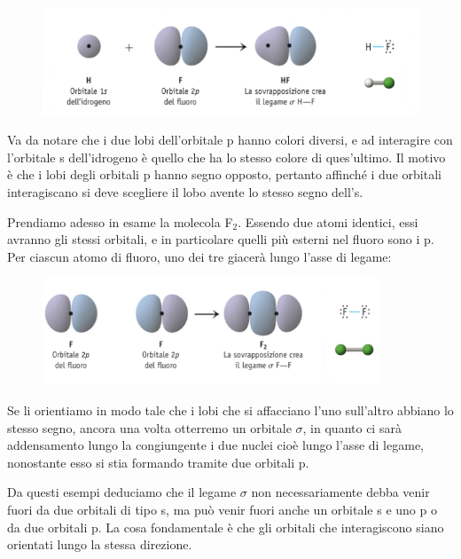 \vspace{-0.5cm}\begin{figure}[htp]
    \centering
    \includegraphics[width=12cm]{immagini/legame_H-F.png}
\end{figure}

\vspace{-0.5cm}Va da notare che i due lobi dell'orbitale p hanno colori diversi, e ad interagire con l'orbitale s dell'idrogeno è quello che ha lo stesso colore di ques'ultimo. Il motivo è che i lobi degli orbitali p hanno segno opposto, pertanto affinché i due orbitali interagiscano si deve scegliere il lobo avente lo stesso segno dell's.

\vspace{0.2cm} Prendiamo adesso in esame la molecola F$_2$. Essendo due atomi identici, essi avranno gli stessi orbitali, e in particolare quelli più esterni nel fluoro sono i p. Per ciascun atomo di fluoro, uno dei tre giacerà lungo l'asse di legame:

\vspace{-0.5cm}\begin{figure}[htp]
    \centering
    \includegraphics[width=10cm]{immagini/legame-F_2.png}
\end{figure}

\vspace{-0.5cm}Se li orientiamo in modo tale che i lobi che si affacciano l'uno sull'altro abbiano lo stesso segno, ancora una volta otterremo un orbitale $\sigma$, in quanto ci sarà addensamento lungo la congiungente i due nuclei cioè lungo l'asse di legame, nonostante esso si stia formando tramite due orbitali p.

\vspace{0.2cm} Da questi esempi deduciamo che il legame $\sigma$ non necessariamente debba venir fuori da due orbitali di tipo s, ma può venir fuori anche un orbitale s e uno p o da due orbitali p. La cosa fondamentale è che gli orbitali che interagiscono siano orientati lungo la stessa direzione.
